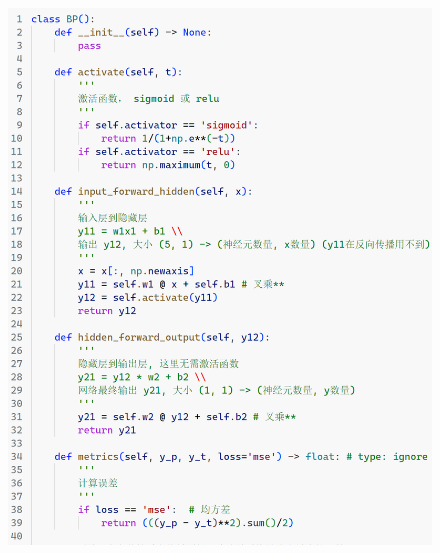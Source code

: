 \documentclass[a5paper, 11pt, openany]{book}
\begin{document}
\begin{figure}[h!]
    \centering
    \includegraphics[width=\textwidth, frame]{figures/BP1.png}
\end{figure}

\newpage
\end{document}
